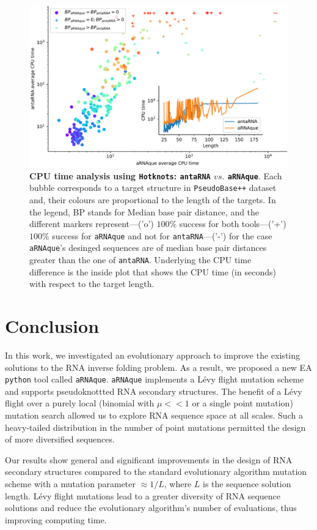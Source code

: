 \begin{figure}[t!]
	\centering
	\includegraphics[width=1.0\linewidth]{../res/images/arnaque/CPU_time_Hotknots.pdf}
	\caption{\textbf{CPU time analysis using \texttt{Hotknots}: \texttt{antaRNA} $vs.$ \texttt{aRNAque}}. Each bubble corresponds to a target structure in \texttt{PseudoBase++} dataset and, their colours are proportional to the length of the targets. In the legend, BP stands for Median base pair distance, and the different markers represent---('o') $100\%$ success for both tools---('+') $100\%$ success for \texttt{aRNAque} and not for \texttt{antaRNA}---('-') for the case \texttt{aRNAque}'s desinged sequences are of median base pair distances greater than the one of \texttt{antaRNA}. Underlying the CPU time difference is the inside plot that shows the CPU time (in seconds) with respect to the target length.}
	\label{fig:cputime_hotknots}
\end{figure}

\section{Conclusion}
In this work, we investigated an evolutionary approach to improve the existing solutions to the RNA inverse folding problem. As a result, we proposed a new EA \texttt{python} tool called \texttt{aRNAque}.  \texttt{aRNAque} implements a Lévy flight mutation scheme and supports pseudoknottted RNA secondary structures. The benefit of a Lévy flight over a purely local (binomial with $\mu<<1$ or a single point mutation) mutation search allowed us to explore RNA sequence space at all scales. Such a heavy-tailed distribution in the number of point mutations permitted the design of more diversified sequences.

Our results show general and significant improvements in the design of RNA secondary structures compared to the standard evolutionary algorithm mutation scheme with a mutation parameter $\approx 1/L$, where $L$ is the sequence solution length. Lévy flight mutations lead to a greater diversity of RNA sequence solutions and reduce the evolutionary algorithm’s number of evaluations, thus improving computing time. 
